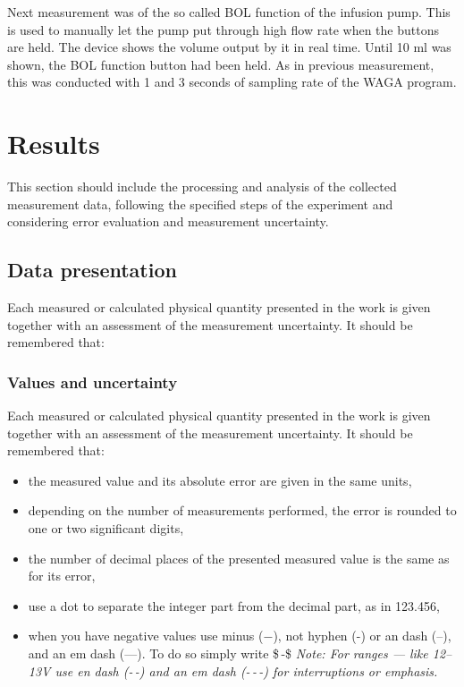 \documentclass[12pt,a4paper]{article}
\begin{document}
	Next measurement was of the so called BOL function of the infusion pump. This is used to manually let the pump put through high flow rate when the buttons are held. The device shows the volume output by it in real time. Until 10 ml was shown, the BOL function button had been held. As in previous measurement, this was conducted with 1 and 3 seconds of sampling rate of the WAGA program.
	
	\section{Results}
	This section should include the processing and analysis of the collected measurement data, following the specified steps of the experiment and considering error evaluation and measurement uncertainty.
	
	\subsection{Data presentation}
	Each measured or calculated physical quantity presented in the work is given together with an assessment of the measurement uncertainty. It should be remembered that:
	
	\subsubsection{Values and uncertainty}
	Each measured or calculated physical quantity presented in the work is given together with an assessment of the measurement uncertainty. 
	It should be remembered that:
	\begin{itemize}
		\item the measured value and its absolute error are given in the same units,
		\item depending on the number of measurements performed, the error is rounded to one or two significant digits,
		\item the number of decimal places of the presented measured value is the same as for its error,
		\item use a dot to separate the integer part from the decimal part, as in 123.456,
		\item when you have negative values use minus ($-$), not hyphen (-) or an dash (--), and an em dash (---). 
		To do so simply write \$\,-\$ {\it Note: For ranges --- like 12--13V use en dash (-\,-) and an em dash (-\,-\,-) for interruptions or emphasis.}
	\end{itemize}
	
\end{document}
